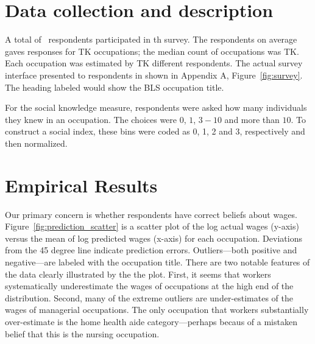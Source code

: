 \documentclass[11pt]{article}
\begin{document}
\section{Data collection and description} 
A total of \N\, respondents participated in th survey. 
The respondents on average gaves responses for TK occupations; the median count of occupations was TK.  
Each occupation was estimated by TK different respondents. 
The actual survey interface presented to respondents in shown in Appendix A, Figure~\ref{fig:survey}. 
The heading labeled would show the BLS occupation title. 

For the social knowledge measure, respondents were asked how many individuals they knew in an occupation. 
The choices were $0$, $1$, $3-10$ and more than $10$. 
To construct a social index, these bins were coded as 0, 1, 2 and 3, respectively and then normalized. 

\section{Empirical Results}

Our primary concern is whether respondents have correct beliefs about wages. 
Figure~\ref{fig:prediction_scatter} is a scatter plot of the log actual wages (y-axis) versus the mean of log predicted wages (x-axis) for each occupation. 
Deviations from the 45 degree line indicate prediction errors. 
Outliers---both positive and negative---are labeled with the occupation title.  
There are two notable features of the data clearly illustrated by the the plot. 
First, it seems that workers systematically underestimate the wages of occupations at the high end of the distribution.  
Second, many of the extreme outliers are under-estimates of the wages of managerial occupations. 
The only occupation that workers substantially over-estimate is the home health aide category---perhaps becaus of a mistaken belief that this is the nursing occupation.
\end{document}
